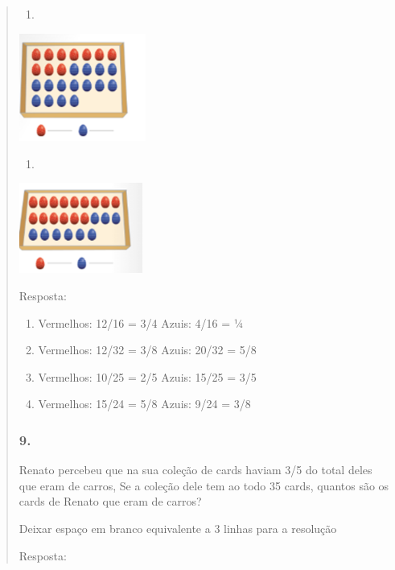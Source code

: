 \begin{enumerate}
\begin{escolha}
\begin{enumerate}
\begin{itemize}
\begin{itemize}
\begin{escolha}
\begin{quote}
\begin{escolha}
{\begin{enumerate}
\def\labelenumi{\alph{enumi})}
\item
\end{enumerate}

\includegraphics[width=1.63347in,height=1.39179in]{media/image120.png}

\begin{enumerate}
\def\labelenumi{\alph{enumi})}
\item
\end{enumerate}

\includegraphics[width=1.60014in,height=1.16677in]{media/image121.png}

Resposta:

\begin{enumerate}
\def\labelenumi{\alph{enumi})}
\item
  Vermelhos: 12/16 = 3/4 Azuis: 4/16 = ¼
\item
  Vermelhos: 12/32 = 3/8 Azuis: 20/32 = 5/8
\item
  Vermelhos: 10/25 = 2/5 Azuis: 15/25 = 3/5
\item
  Vermelhos: 15/24 = 5/8 Azuis: 9/24 = 3/8
\end{enumerate}

\subsubsection{9.}\label{section-112}

Renato percebeu que na sua coleção de cards haviam 3/5 do total deles
que eram de carros, Se a coleção dele tem ao todo 35 cards, quantos são
os cards de Renato que eram de carros?

Deixar espaço em branco equivalente a 3 linhas para a resolução

Resposta:

}
\end{escolha}
\end{quote}
\end{escolha}
\end{itemize}
\end{itemize}
\end{enumerate}
\end{escolha}
\end{enumerate}
